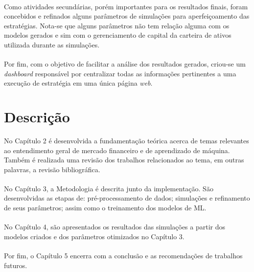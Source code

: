 \paragraph{} Como atividades secundárias, porém importantes para os resultados finais, foram concebidos e refinados alguns parâmetros de simulações para aperfeiçoamento das estratégias. Nota-se que alguns parâmetros não tem relação alguma com os modelos gerados e sim com o gerenciamento de capital da carteira de ativos utilizada durante as simulações.

\paragraph{} Por fim, com o objetivo de facilitar a análise dos resultados gerados, criou-se um \textit{dashboard} responsável por centralizar todas as informações pertinentes a uma execução de estratégia em uma única página \textit{web}.




\FloatBarrier
\section{Descrição}

\paragraph{} No Capítulo 2 é desenvolvida a fundamentação teórica acerca de temas relevantes ao entendimento geral de mercado financeiro e de aprendizado de máquina. Também é realizada uma revisão dos trabalhos relacionados ao tema, em outras palavras, a revisão bibliográfica.

\paragraph{} No Capítulo 3, a Metodologia é descrita junto da implementação. São desenvolvidas as etapas de: pré-processamento de dados; simulações e refinamento de seus parâmetros; assim como o treinamento dos modelos de ML.

\paragraph{} No Capítulo 4, são apresentados os resultados das simulações a partir dos modelos criados e dos parâmetros otimizados no Capítulo 3.

\paragraph{} Por fim, o Capítulo 5 encerra com a conclusão e as recomendações de trabalhos futuros.